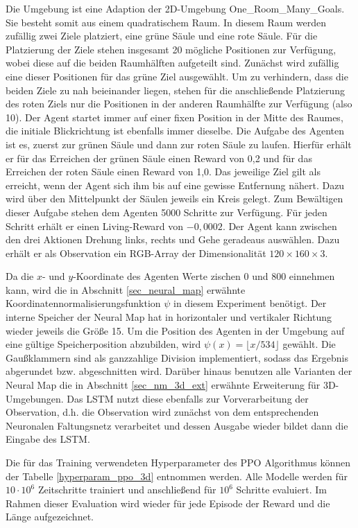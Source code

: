 Die Umgebung ist eine Adaption der 2D-Umgebung \glqq One\_Room\_Many\_Goals\grqq{}. Sie besteht somit aus einem quadratischem Raum. In diesem Raum werden zufällig zwei Ziele platziert, eine grüne Säule und eine rote Säule. Für die Platzierung der Ziele stehen insgesamt 20 mögliche Positionen zur Verfügung, wobei diese auf die beiden Raumhälften aufgeteilt sind. Zunächst wird zufällig eine dieser Positionen für das grüne Ziel ausgewählt. Um zu verhindern, dass die beiden Ziele zu nah beieinander liegen, stehen für die anschließende Platzierung des roten Ziels nur die Positionen in der anderen Raumhälfte zur Verfügung (also 10). Der Agent startet immer auf einer fixen Position in der Mitte des Raumes, die initiale Blickrichtung ist ebenfalls immer dieselbe. Die Aufgabe des Agenten ist es, zuerst zur grünen Säule und dann zur roten Säule zu laufen. Hierfür erhält er für das Erreichen der grünen Säule einen Reward von 0,2 und für das Erreichen der roten Säule einen Reward von 1,0. Das jeweilige Ziel gilt als erreicht, wenn der Agent sich ihm bis auf eine gewisse Entfernung nähert. Dazu wird über den Mittelpunkt der Säulen jeweils ein Kreis gelegt. Zum Bewältigen dieser Aufgabe stehen dem Agenten 5000 Schritte zur Verfügung. Für jeden Schritt erhält er einen Living-Reward von $-0,0002$. Der Agent kann zwischen den drei Aktionen \glqq Drehung links\grqq{}, \glqqDrehung rechts\grqq{} und \glqq Gehe geradeaus\grqq{} auswählen. Dazu erhält er als Observation ein RGB-Array der Dimensionalität $120 \times 160 \times 3$.

Da die $x$- und $y$-Koordinate des Agenten Werte zischen 0 und 800 einnehmen kann, wird die in Abschnitt \ref{sec_neural_map} erwähnte Koordinatennormalisierungsfunktion $\psi$ in diesem Experiment benötigt. Der interne Speicher der Neural Map hat in horizontaler und vertikaler Richtung wieder jeweils die Größe 15. Um die Position des Agenten in der Umgebung auf eine gültige Speicherposition abzubilden, wird $\psi(x) = \lfloor x / 534\rfloor$ gewählt. Die Gaußklammern sind als ganzzahlige Division implementiert, sodass das Ergebnis abgerundet bzw. abgeschnitten wird. Darüber hinaus benutzen alle Varianten der Neural Map die in Abschnitt \ref{sec_nm_3d_ext} erwähnte Erweiterung für 3D-Umgebungen. Das \ac{LSTM} nutzt diese ebenfalls zur Vorverarbeitung der Observation, d.h. die Observation wird zunächst von dem entsprechenden Neuronalen Faltungsnetz verarbeitet und dessen Ausgabe wieder bildet dann die Eingabe des \ac{LSTM}.

Die für das Training verwendeten Hyperparameter des \ac{PPO} Algorithmus können der Tabelle \ref{hyperparam_ppo_3d} entnommen werden. Alle Modelle werden für $10\cdot10^6$ Zeitschritte trainiert und anschließend für $10^6$ Schritte evaluiert. Im Rahmen dieser Evaluation wird wieder für jede Episode der Reward und die Länge aufgezeichnet.

